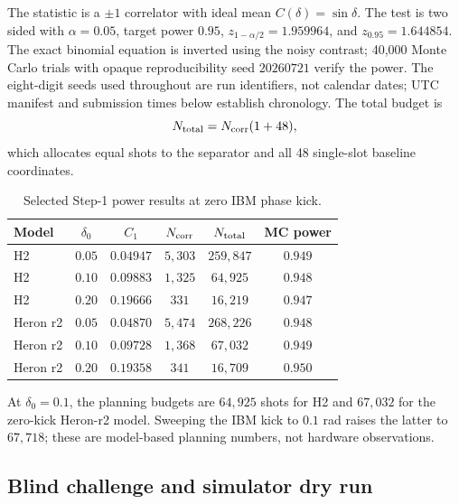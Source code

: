 \documentclass[aps,prl,reprint,superscriptaddress,nofootinbib]{revtex4-2}
\begin{document}
The statistic is a $\pm1$ correlator with ideal mean $C(\delta)=\sin\delta$.  The test is two sided with $\alpha=0.05$, target power $0.95$, $z_{1-\alpha/2}=1.959964$, and $z_{0.95}=1.644854$.  The exact binomial equation is inverted using the noisy contrast; 40,000 Monte Carlo trials with opaque reproducibility seed $20260721$ verify the power.  The eight-digit seeds used throughout are run identifiers, not calendar dates; UTC manifest and submission times below establish chronology.  The total budget is
\begin{equation}
 N_{\rm total}=N_{\rm corr}(1+48),
 \label{eq:power-total}
\end{equation}
which allocates equal shots to the separator and all 48 single-slot baseline coordinates.

\begin{table}[t]
\caption{Selected Step-1 power results at zero IBM phase kick.}
\label{tab:step1-power}
\begin{ruledtabular}
\begin{tabular}{lccccc}
Model & $\delta_0$ & $C_1$ & $N_{\rm corr}$ & $N_{\rm total}$ & MC power\\
\hline
H2 & $0.05$ & $0.04947$ & $5{,}303$ & $259{,}847$ & $0.949$\\
H2 & $0.10$ & $0.09883$ & $1{,}325$ & $64{,}925$ & $0.948$\\
H2 & $0.20$ & $0.19666$ & $331$ & $16{,}219$ & $0.947$\\
Heron r2 & $0.05$ & $0.04870$ & $5{,}474$ & $268{,}226$ & $0.948$\\
Heron r2 & $0.10$ & $0.09728$ & $1{,}368$ & $67{,}032$ & $0.949$\\
Heron r2 & $0.20$ & $0.19358$ & $341$ & $16{,}709$ & $0.950$\\
\end{tabular}
\end{ruledtabular}
\end{table}

At $\delta_0=0.1$, the planning budgets are $64{,}925$ shots for H2 and $67{,}032$ for the zero-kick Heron-r2 model.  Sweeping the IBM kick to $0.1$ rad raises the latter to $67{,}718$; these are model-based planning numbers, not hardware observations.

\subsection{Blind challenge and simulator dry run}
\end{document}
